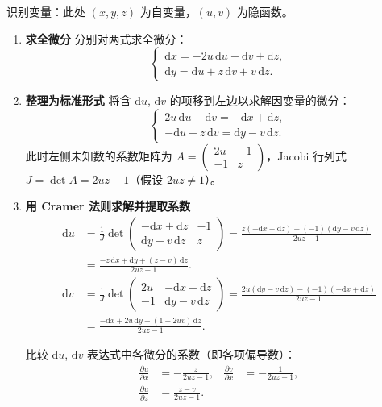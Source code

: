\documentclass[lang=cn,11pt]{elegantbook}
\begin{document}
\begin{solution}
识别变量：此处 $(x,y,z)$ 为自变量，$(u,v)$ 为隐函数。

\begin{enumerate}
  \item \textbf{求全微分}
  分别对两式求全微分：
  \[
  \begin{cases}
  \mathrm{d}x = -2u\,\mathrm{d}u+\mathrm{d}v+\mathrm{d}z,\\[6pt]
  \mathrm{d}y = \mathrm{d}u+z\,\mathrm{d}v+v\,\mathrm{d}z.
  \end{cases}
  \]

  \item \textbf{整理为标准形式}
  将含 $\mathrm{d}u$, $\mathrm{d}v$ 的项移到左边以求解因变量的微分：
  \[
  \begin{cases}
  2u\,\mathrm{d}u-\mathrm{d}v = -\mathrm{d}x+\mathrm{d}z,\\[6pt]
  -\mathrm{d}u+z\,\mathrm{d}v = \mathrm{d}y-v\,\mathrm{d}z.
  \end{cases}
  \]
  此时左侧未知数的系数矩阵为 $A=\begin{pmatrix} 2u & -1 \\ -1 & z \end{pmatrix}$，Jacobi 行列式 $J=\det A=2uz-1$（假设 $2uz \neq 1$）。

  \item \textbf{用 Cramer 法则求解并提取系数}
  \begin{align*}
  \mathrm{d}u &= \frac{1}{J}\det\begin{pmatrix}
    -\mathrm{d}x+\mathrm{d}z & -1\\
    \mathrm{d}y-v\,\mathrm{d}z & z
  \end{pmatrix}
   = \frac{z(-\mathrm{d}x+\mathrm{d}z)-(-1)(\mathrm{d}y-v\,\mathrm{d}z)}{2uz-1}\\[8pt]
  &= \frac{-z\,\mathrm{d}x+\mathrm{d}y+(z-v)\,\mathrm{d}z}{2uz-1}. \\[12pt]
  \mathrm{d}v &= \frac{1}{J}\det\begin{pmatrix}
    2u & -\mathrm{d}x+\mathrm{d}z\\
    -1 & \mathrm{d}y-v\,\mathrm{d}z
  \end{pmatrix}
   = \frac{2u(\mathrm{d}y-v\,\mathrm{d}z)-(-1)(-\mathrm{d}x+\mathrm{d}z)}{2uz-1}\\[8pt]
  &= \frac{-\mathrm{d}x+2u\,\mathrm{d}y+(1-2uv)\,\mathrm{d}z}{2uz-1}.
  \end{align*}
  
  比较 $\mathrm{d}u$, $\mathrm{d}v$ 表达式中各微分的系数（即各项偏导数）：
  \[
  \boxed{
  \begin{aligned}
  \frac{\partial u}{\partial x} &= -\frac{z}{2uz-1}, &
  \frac{\partial v}{\partial x} &= -\frac{1}{2uz-1},\\[8pt]
  \frac{\partial u}{\partial z} &= \frac{z-v}{2uz-1}.
  \end{aligned}}
  \]
\end{enumerate}
\end{solution}
\end{document}
